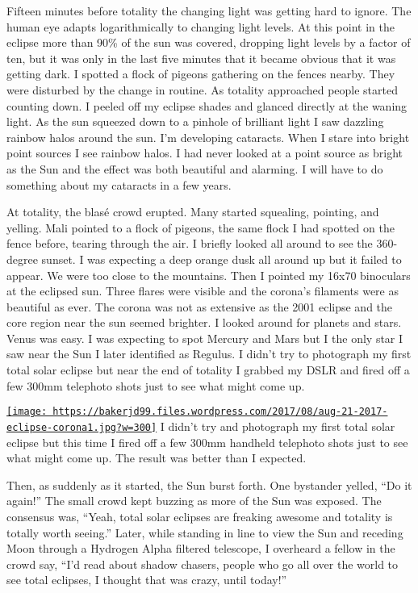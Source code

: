 Fifteen minutes before totality the changing light was getting hard to
ignore. The human eye adapts logarithmically to changing light levels.
At this point in the eclipse more than 90\% of the sun was covered,
dropping light levels by a factor of ten, but it was only in the last
five minutes that it became obvious that it was getting dark. I spotted
a flock of pigeons gathering on the fences nearby. They were disturbed
by the change in routine. As totality approached people started counting
down. I peeled off my eclipse shades and glanced directly at the waning
light. As the sun squeezed down to a pinhole of brilliant light I saw
dazzling rainbow halos around the sun. I'm developing cataracts. When I
stare into bright point sources I see rainbow halos. I had never looked
at a point source as bright as the Sun and the effect was both beautiful
and alarming. I will have to do something about my cataracts in a few
years.

At totality, the blasé crowd erupted. Many started squealing, pointing,
and yelling. Mali pointed to a flock of pigeons, the same flock I had
spotted on the fence before, tearing through the air. I briefly looked
all around to see the 360-degree sunset. I was expecting a deep orange
dusk all around up but it failed to appear. We were too close to the
mountains. Then I pointed my 16x70 binoculars at the eclipsed sun. Three
flares were visible and the corona's filaments were as beautiful as
ever. The corona was not as extensive as the 2001 eclipse and the core
region near the sun seemed brighter. I looked around for planets and
stars. Venus was easy. I was expecting to spot Mercury and Mars but I
the only star I saw near the Sun I later identified as Regulus. I didn't
try to photograph my first total solar eclipse but near the end of
totality I grabbed my DSLR and fired off a few 300mm telephoto shots
just to see what might come up.


\href{https://conceptcontrol.smugmug.com/Places/USA-and-Canada/Idaho-Instants/i-25dfJkS/A}{\texttt{[image: https://bakerjd99.files.wordpress.com/2017/08/aug-21-2017-eclipse-corona1.jpg?w=300]}}
I didn't try and photograph my first total solar eclipse but this time I
fired off a few 300mm handheld telephoto shots just to see what might
come up. The result was better than I expected.


Then, as suddenly as it started, the Sun burst forth. One bystander
yelled, ``Do it again!'' The small crowd kept buzzing as more of the Sun
was exposed. The consensus was, ``Yeah, total solar eclipses are
freaking awesome and totality is totally worth seeing.'' Later, while
standing in line to view the Sun and receding Moon through a Hydrogen
Alpha filtered telescope, I overheard a fellow in the crowd say, ``I'd
read about shadow chasers, people who go all over the world to see total
eclipses, I thought that was crazy, until today!''

